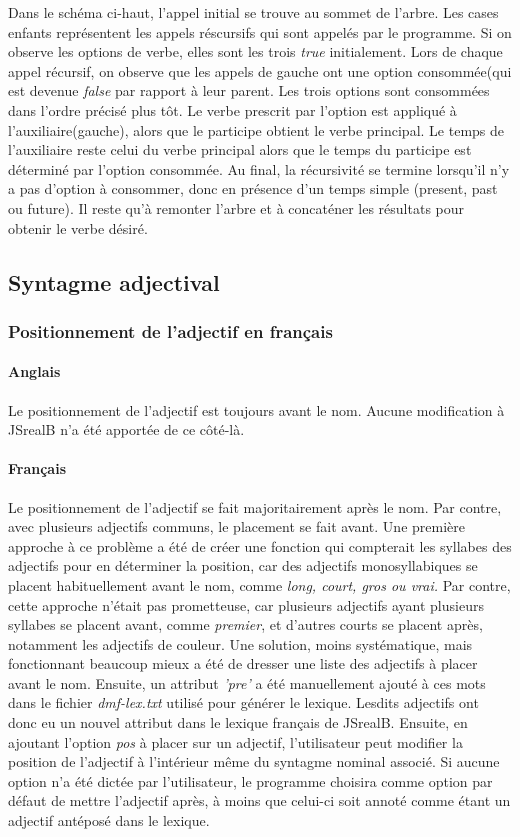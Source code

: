 \documentclass[11pt]{article} %
\newcommand{\system}[1]{\textsf{#1}}
\newcommand{\JSB}{\system{JSrealB}}
\begin{document}
{\small{} Dans le schéma ci-haut, l'appel initial se trouve au sommet de l'arbre. Les 
cases enfants représentent les appels réscursifs qui sont appelés par le programme.
Si on observe les options de verbe, elles sont les trois \emph{true} initialement. Lors de
chaque appel récursif, on observe que les appels de gauche ont une option consommée(qui est devenue
\emph{false} par rapport à leur parent. Les trois options sont consommées dans l'ordre précisé plus tôt. 
Le verbe prescrit par l'option est appliqué à l'auxiliaire(gauche), alors que le participe obtient le verbe 
principal. Le temps de l'auxiliaire reste celui du verbe principal alors que le temps du participe est déterminé
 par l'option consommée. Au final, la récursivité se termine lorsqu'il n'y a pas d'option à consommer, donc en
présence d'un temps simple (present, past ou future). Il reste qu'à remonter l'arbre et à concaténer les résultats
pour obtenir le verbe désiré.}

\subsection{Syntagme adjectival}
\subsubsection{Positionnement de l'adjectif en français}
\paragraph{Anglais} Le positionnement de l'adjectif est toujours avant le nom. 
Aucune modification à \JSB{} n'a été apportée de ce côté-là.
\paragraph{Français}
Le positionnement de l'adjectif se fait majoritairement
après le nom. Par contre, avec plusieurs adjectifs communs, le placement
se fait avant. Une première approche à ce problème a été de créer
une fonction qui compterait les syllabes des adjectifs pour en déterminer
la position, car des adjectifs monosyllabiques se placent habituellement
avant le nom, comme \emph{long, court, gros ou vrai.} Par contre,
cette approche n'était pas prometteuse, car plusieurs adjectifs ayant
plusieurs syllabes se placent avant, comme \emph{premier}, et d'autres
courts se placent après, notamment les adjectifs de couleur. Une solution,
moins systématique, mais fonctionnant beaucoup mieux a été de dresser
une liste des adjectifs à placer avant le nom. Ensuite, un attribut
\emph{'pre'} a été manuellement ajouté à ces mots dans le fichier
\emph{dmf-lex.txt }utilisé pour générer le lexique. Lesdits adjectifs
ont donc eu un nouvel attribut dans le lexique français de \JSB{}.
Ensuite, en ajoutant l'option \emph{pos} à placer sur un adjectif,
l'utilisateur peut modifier la position de l'adjectif à l'intérieur
même du syntagme nominal associé. Si aucune option n'a été dictée
par l'utilisateur, le programme choisira comme option par défaut de
mettre l'adjectif après, à moins que celui-ci soit annoté comme étant
un adjectif antéposé dans le lexique. 
\end{document}
